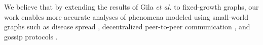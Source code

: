 

We believe that by extending the results of Gila {\it et al.} to fixed-growth graphs, our work enables more accurate analyses of phenomena
modeled using small-world graphs such as disease spread
\cite{BARTHELEMY20111,warren2001firewallsdisorderpercolationepidemics,SANDER20031,LI2021111294,costaanalyzing2011},
decentralized peer-to-peer communication
\cite{dahliaviceroy2002,zhangusing2002,qindongsecure2022,shinsmall2011,li2005searching,singla2012jellyfish,hui2004small},
and gossip protocols \cite{kempe2004spatial,kempe2002protocols}.



